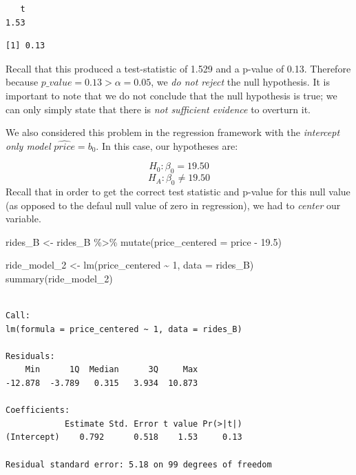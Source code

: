 \documentclass[
  letterpaper,
  DIV=11,
  numbers=noendperiod]{scrreprt}
\newenvironment{Shaded}{\begin{snugshade}}{\end{snugshade}}
\newcommand{\AttributeTok}[1]{\textcolor[rgb]{0.40,0.45,0.13}{#1}}
\newcommand{\DecValTok}[1]{\textcolor[rgb]{0.68,0.00,0.00}{#1}}
\newcommand{\FloatTok}[1]{\textcolor[rgb]{0.68,0.00,0.00}{#1}}
\newcommand{\FunctionTok}[1]{\textcolor[rgb]{0.28,0.35,0.67}{#1}}
\newcommand{\NormalTok}[1]{\textcolor[rgb]{0.00,0.23,0.31}{#1}}
\newcommand{\OtherTok}[1]{\textcolor[rgb]{0.00,0.23,0.31}{#1}}
\newcommand{\SpecialCharTok}[1]{\textcolor[rgb]{0.37,0.37,0.37}{#1}}
\theoremstyle{definition}
\theoremstyle{remark}
\begin{document}
\begin{verbatim}
   t 
1.53 
\end{verbatim}

\begin{Shaded}
\end{Shaded}

\begin{verbatim}
[1] 0.13
\end{verbatim}

Recall that this produced a test-statistic of 1.529 and a p-value of
0.13. Therefore because \(p\_value = 0.13 > \alpha = 0.05\), we \emph{do
not reject} the null hypothesis. It is important to note that we do not
conclude that the null hypothesis is true; we can only simply state that
there is \emph{not sufficient evidence} to overturn it.

We also considered this problem in the regression framework with the
\emph{intercept only model} \(\widehat{price} = b_0\). In this case, our
hypotheses are:

\[H_0: \beta_0 = 19.50\] \[H_A: \beta_0 \neq 19.50\] Recall that in
order to get the correct test statistic and p-value for this null value
(as opposed to the defaul null value of zero in regression), we had to
\emph{center} our variable.

\begin{Shaded}
\begin{Highlighting}[]
\NormalTok{rides\_B }\OtherTok{\textless{}{-}}\NormalTok{ rides\_B }\SpecialCharTok{\%\textgreater{}\%} 
  \FunctionTok{mutate}\NormalTok{(}\AttributeTok{price\_centered =}\NormalTok{ price }\SpecialCharTok{{-}} \FloatTok{19.5}\NormalTok{)}

\NormalTok{ride\_model\_2 }\OtherTok{\textless{}{-}} \FunctionTok{lm}\NormalTok{(price\_centered }\SpecialCharTok{\textasciitilde{}} \DecValTok{1}\NormalTok{, }\AttributeTok{data =}\NormalTok{ rides\_B)}
\FunctionTok{summary}\NormalTok{(ride\_model\_2)}
\end{Highlighting}
\end{Shaded}

\begin{verbatim}

Call:
lm(formula = price_centered ~ 1, data = rides_B)

Residuals:
    Min      1Q  Median      3Q     Max 
-12.878  -3.789   0.315   3.934  10.873 

Coefficients:
            Estimate Std. Error t value Pr(>|t|)
(Intercept)    0.792      0.518    1.53     0.13

Residual standard error: 5.18 on 99 degrees of freedom
\end{verbatim}
\end{document}
